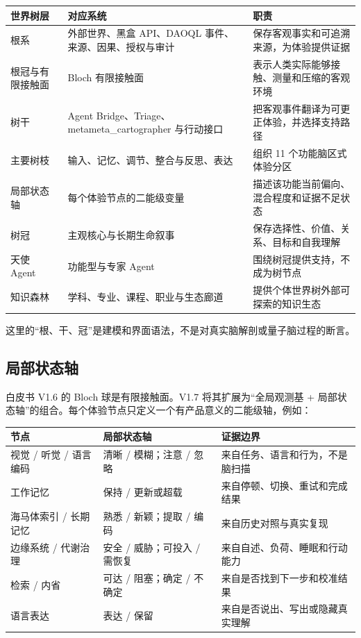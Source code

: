 \documentclass[UTF8,a4paper,11pt]{ctexart}
\begin{document}
\begin{center}
\begin{longtable}{@{}p{3.2cm}p{5.1cm}p{5.0cm}@{}}
\toprule
\textbf{世界树层} & \textbf{对应系统} & \textbf{职责} \\
\midrule
根系 & 外部世界、黑盒 API、DAOQL 事件、来源、因果、授权与审计 & 保存客观事实和可追溯来源，为体验提供证据 \\
根冠与有限接触面 & Bloch 有限接触面 & 表示人类实际能够接触、测量和压缩的客观环境 \\
树干 & Agent Bridge、Triage、metameta\_cartographer 与行动接口 & 把客观事件翻译为可更正体验，并选择支持路径 \\
主要树枝 & 输入、记忆、调节、整合与反思、表达 & 组织 11 个功能脑区式体验分区 \\
局部状态轴 & 每个体验节点的二能级变量 & 描述该功能当前偏向、混合程度和证据不足状态 \\
树冠 & 主观核心与长期生命叙事 & 保存选择性、价值、关系、目标和自我理解 \\
天使 Agent & 功能型与专家 Agent & 围绕树冠提供支持，不成为树节点 \\
知识森林 & 学科、专业、课程、职业与生态廊道 & 提供个体世界树外部可探索的知识生态 \\
\bottomrule
\end{longtable}
\end{center}

这里的“根、干、冠”是建模和界面语法，不是对真实脑解剖或量子脑过程的断言。

\subsection{局部状态轴}

白皮书 V1.6 的 Bloch 球是有限接触面。V1.7 将其扩展为“全局观测基 + 局部状态轴”的组合。每个体验节点只定义一个有产品意义的二能级轴，例如：

\begin{center}
\begin{longtable}{@{}p{4.3cm}p{4.0cm}p{5.0cm}@{}}
\toprule
\textbf{节点} & \textbf{局部状态轴} & \textbf{证据边界} \\
\midrule
视觉 / 听觉 / 语言编码 & 清晰 / 模糊；注意 / 忽略 & 来自任务、语言和行为，不是脑扫描 \\
工作记忆 & 保持 / 更新或超载 & 来自停顿、切换、重试和完成结果 \\
海马体索引 / 长期记忆 & 熟悉 / 新颖；提取 / 编码 & 来自历史对照与真实复现 \\
边缘系统 / 代谢治理 & 安全 / 威胁；可投入 / 需恢复 & 来自自述、负荷、睡眠和行动能力 \\
检索 / 内省 & 可达 / 阻塞；确定 / 不确定 & 来自是否找到下一步和校准结果 \\
语言表达 & 表达 / 保留 & 来自是否说出、写出或隐藏真实理解 \\
\bottomrule
\end{longtable}
\end{center}
\end{document}
